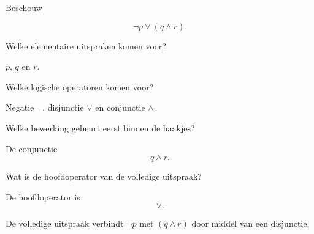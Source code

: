 \documentclass{ximera}
\begin{document}
  \begin{oefening}{\oefU \ESS}

  Beschouw

  \[
  \neg p\lor(q\land r).
  \]

  \begin{question}
  Welke elementaire uitspraken komen voor?

  \begin{oplossing}
  $p$, $q$ en $r$.
  \end{oplossing}
  \end{question}


  \begin{question}
  Welke logische operatoren komen voor?

  \begin{oplossing}
  Negatie $\neg$, disjunctie $\lor$ en conjunctie $\land$.
  \end{oplossing}
  \end{question}


  \begin{question}
  Welke bewerking gebeurt eerst binnen de haakjes?

  \begin{oplossing}
  De conjunctie
  \[
  q\land r.
  \]
  \end{oplossing}
  \end{question}


  \begin{question}
  Wat is de hoofdoperator van de volledige uitspraak?

  \begin{oplossing}
  De hoofdoperator is
  \[
  \lor.
  \]

  De volledige uitspraak verbindt $\neg p$ met $(q\land r)$ door middel
  van een disjunctie.
  \end{oplossing}
  \end{question}

  \end{oefening}



  
\end{document}
